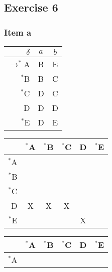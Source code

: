 \documentclass[docid=TP07]{tcom_TP}
\begin{document}
{\begin{center}
\begin{minipage}[c]{0.40\textwidth}
\begin{center}
\end{center}
\end{minipage}
\end{center}
\subsection{Exercise 6}
\subsubsection{Item a}
\begin{center} \begin{tabular}{r | c c}
	$\delta$ & $a$ & $b$ \\ \hline
	$\rightarrow^*$A  & B  & E  \\
	$^*$B  & B  & C  \\
	$^*$C  & D  & C  \\
	D      & D  & D  \\
	$^*$E  & D  & E  
\end{tabular} \end{center}
\begin{center} \begin{tabular}{r || c | c | c | c | c}
	       & $^*$A  & $^*$B  & $^*$C & D  & $^*$E  \\ \hline \hline
	$^*$A  & \cellcolor{gray} & \cellcolor{gray} & \cellcolor{gray} & \cellcolor{gray} & \cellcolor{gray} \\ \hline
	$^*$B  &    & \cellcolor{gray} & \cellcolor{gray} & \cellcolor{gray} & \cellcolor{gray} \\ \hline
	$^*$C  &    &    & \cellcolor{gray} & \cellcolor{gray} & \cellcolor{gray} \\ \hline
	D      & X  & X  & X  & \cellcolor{gray} & \cellcolor{gray} \\ \hline
	$^*$E  &    &    &    & X  & \cellcolor{gray}
\end{tabular} \end{center}
\begin{center} \begin{tabular}{r || c | c | c | c | c}
	       & $^*$A  & $^*$B  & $^*$C & D  & $^*$E  \\ \hline \hline
	$^*$A  & \cellcolor{gray} & \cellcolor{gray} & \cellcolor{gray} & \cellcolor{gray} & \cellcolor{gray} \\ \hline

\end{tabular}
\end{center}}
\end{document}

